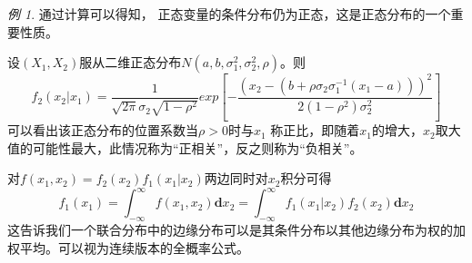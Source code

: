 \documentclass[a4paper,11pt]{article}%
\theoremstyle{remark}
\theoremstyle{remark}
\newtheorem*{example}{例}
\theoremstyle{definition}
\theoremstyle{definition}
\theoremstyle{plain}
\begin{document}
    \begin{example}
    通过计算可以得知， 正态变量的条件分布仍为正态，这是正态分布的一个重要性质。
    
    设$(X_1,X_2)$服从二维正态分布$N(a,b,\sigma_1^2,\sigma_2^2,\rho)$。则
    \[f_2(x_2|x_1)=\frac{1}{\sqrt{2\pi}\sigma_2\sqrt{1-\rho^2}}exp[-\frac{(x_2-(b+\rho\sigma_2\sigma_1^{-1}(x_1-a)))^2}{2(1-\rho^2)\sigma_2^2}]\]
    可以看出该正态分布的位置系数当$\rho>0$时与$x_1$ 称正比，即随着$x_1$的增大，$x_2$取大值的可能性最大，此情况称为“正相关”，反之则称为“负相关”。
    \end{example}

    对$f(x_1,x_2)=f_2(x_2)f_1(x_1|x_2)$两边同时对$x_2$积分可得
    \[f_1(x_1)=\int_{-\infty}^{\infty}f(x_1,x_2)\mathbf{d}x_2=\int_{-\infty}^{\infty}f_1(x_1|x_2)f_2(x_2)\mathbf{d}x_2\]
    这告诉我们一个联合分布中的边缘分布可以是其条件分布以其他边缘分布为权的加权平均。可以视为连续版本的全概率公式。
\end{document}
